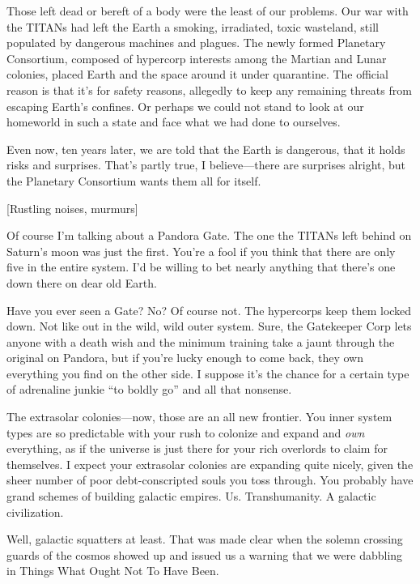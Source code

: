 Those left dead or bereft of a body were the least 
of our problems. Our war with the TITANs had left 
the Earth a smoking, irradiated, toxic wasteland, still 
populated by dangerous machines and plagues. The 
newly formed Planetary Consortium, composed of 
hypercorp interests among the Martian and Lunar 
colonies, placed Earth and the space around it under 
quarantine. The official reason is that it's for safety 
reasons, allegedly to keep any remaining threats from 
escaping Earth's confines. Or perhaps we could not 
stand to look at our homeworld in such a state and 
face what we had done to ourselves.

Even now, ten years later, we are told that the Earth 
is dangerous, that it holds risks and surprises. That's 
partly true, I believe—there are surprises alright, but 
the Planetary Consortium wants them all for itself.

[Rustling noises, murmurs]

Of course I'm talking about a Pandora Gate. The 
one the TITANs left behind on Saturn's moon was 
just the first. You're a fool if you think that there are 
only five in the entire system. I'd be willing to bet 
nearly anything that there's one down there on dear 
old Earth.

Have you ever seen a Gate? No? Of course not. 
The hypercorps keep them locked down. Not like out 
in the wild, wild outer system. Sure, the Gatekeeper 
Corp lets anyone with a death wish and the minimum 
training take a jaunt through the original on Pandora, 
but if you're lucky enough to come back, they own 
everything you find on the other side. I suppose it's 
the chance for a certain type of adrenaline junkie ``to 
boldly go'' and all that nonsense.

The extrasolar colonies—now, those are an all new 
frontier. You inner system types are so predictable 
with your rush to colonize and expand and \textit{own}
everything, as if the universe is just there for your 
rich overlords to claim for themselves. I expect your 
extrasolar colonies are expanding quite nicely, given 
the sheer number of poor debt-conscripted souls you 
toss through. You probably have grand schemes of 
building galactic empires. Us. Transhumanity. A galactic civilization.

Well, galactic squatters at least. That was made 
clear when the solemn crossing guards of the cosmos 
showed up and issued us a warning that we were 
dabbling in Things What Ought Not To Have Been. 

